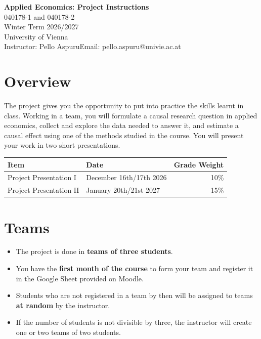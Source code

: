 \documentclass[11pt]{article}
\makeatletter
\newcommand{\university}{University of Vienna}
\newcommand{\coursename}{Applied Economics}
\newcommand{\coursecode}{040178-1 and 040178-2}
\newcommand{\semester}{Winter Term 2026/2027}
\newcommand{\instructor}{Pello Aspuru}
\newcommand{\email}{pello.aspuru@univie.ac.at}
\makeatother
\begin{document}
\begin{center}
    {\Large \textbf{\coursename: Project Instructions}} \\
    \coursecode \\
    \semester \\
    \vspace{0.3cm}
    {\university} \\
    \vspace{0.3cm}
    Instructor: \instructor \quad Email: \email
\end{center}

\section{Overview}
The project gives you the opportunity to put into practice the skills learnt in class. Working in a team, you will formulate a causal research question in applied economics, collect and explore the data needed to answer it, and estimate a causal effect using one of the methods studied in the course. You will present your work in two short presentations.

\begin{center}
\begin{tabular}{llr}
    \toprule
    \textbf{Item} & \textbf{Date} & \textbf{Grade Weight} \\
    \midrule
    Project Presentation I & December 16th/17th 2026 & 10\% \\
    Project Presentation II & January 20th/21st 2027 & 15\% \\
    \bottomrule
\end{tabular}
\end{center}

\section{Teams}
\begin{itemize}
    \item The project is done in \textbf{teams of three students}.
    \item You have the \textbf{first month of the course} to form your team and register it in the Google Sheet provided on Moodle.
    \item Students who are not registered in a team by then will be assigned to teams \textbf{at random} by the instructor.
    \item If the number of students is not divisible by three, the instructor will create one or two teams of two students.
\end{itemize}
\end{document}
